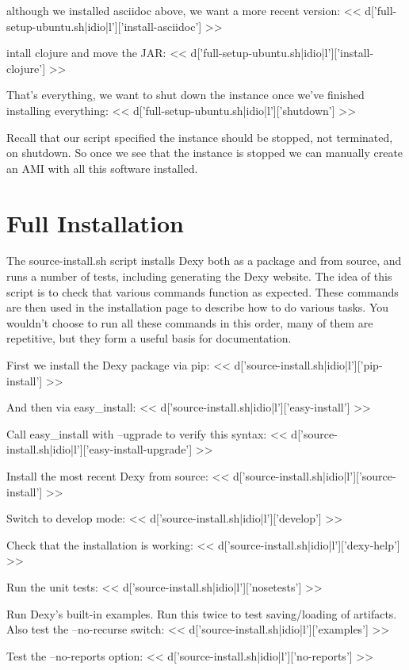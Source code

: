 \documentclass{tufte-handout}
\begin{document}
although we installed asciidoc above, we want a more recent version:
<< d['full-setup-ubuntu.sh|idio|l']['install-asciidoc'] >>

intall clojure and move the JAR:
<< d['full-setup-ubuntu.sh|idio|l']['install-clojure'] >>

That's everything, we want to shut down the instance once we've finished installing everything:
<< d['full-setup-ubuntu.sh|idio|l']['shutdown'] >>

Recall that our script specified the instance should be stopped, not terminated, on shutdown. So once we see that the instance is stopped we can manually create an AMI with all this software installed.

\section{Full Installation}

The source-install.sh script installs Dexy both as a package and from source, and runs a number of tests, including generating the Dexy website. The idea of this script is to check that various commands function as expected. These commands are then used in the installation page to describe how to do various tasks. You wouldn't choose to run all these commands in this order, many of them are repetitive, but they form a useful basis for documentation.

First we install the Dexy package via pip:
<< d['source-install.sh|idio|l']['pip-install'] >>

And then via easy\_install:
<< d['source-install.sh|idio|l']['easy-install'] >>

Call easy\_install with --ugprade to verify this syntax:
<< d['source-install.sh|idio|l']['easy-install-upgrade'] >>

Install the most recent Dexy from source:
<< d['source-install.sh|idio|l']['source-install'] >>

Switch to develop mode:
<< d['source-install.sh|idio|l']['develop'] >>

Check that the installation is working:
<< d['source-install.sh|idio|l']['dexy-help'] >>

Run the unit tests:
<< d['source-install.sh|idio|l']['nosetests'] >>

Run Dexy's built-in examples. Run this twice to test saving/loading of artifacts. Also test the --no-recurse switch:
<< d['source-install.sh|idio|l']['examples'] >>

Test the --no-reports option:
<< d['source-install.sh|idio|l']['no-reports'] >>
\end{document}

